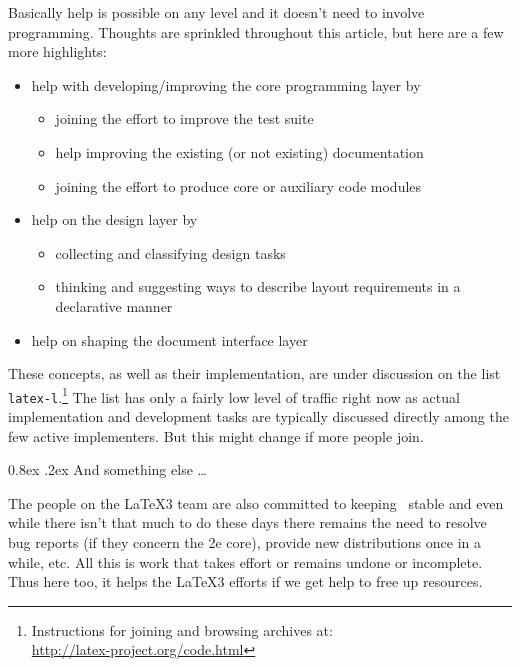 \documentclass{ltnews}
\makeatletter
\renewcommand{\@subheadingfont}{%
   \sffamily\slshape
   \let\LaTeX\cmssLaTeX\let\TeX\cmssTeX
}
\renewcommand{\subsection}{%
   \@startsection
      {subsection}{2}{\z@}{-1.3ex \@plus -1ex \@minus -.2ex}%
      {0.8ex \@plus.2ex}{\@subheadingfont}%
}
\makeatother
\begin{document}
Basically help is possible on any level and it doesn't need to involve programming. Thoughts are sprinkled throughout this article, but here are a few more highlights:
\begin{itemize}
\item help with developing/improving the core programming layer by
\begin{itemize}[nosep]
\item joining the effort to improve the test suite
\item help improving the existing (or not existing) documentation
\item joining the effort to produce core or auxiliary code modules
\end{itemize}
\item help on the design layer by
\begin{itemize}[nosep]
\item collecting and classifying design tasks
\item thinking and suggesting ways to describe layout requirements in a declarative manner
\end{itemize}
\item help on shaping the document interface layer
\end{itemize}
These concepts, as well as their implementation, are under discussion on the list \texttt{latex-l}.\footnote{Instructions for joining and browsing archives at:\\ \url{http://latex-project.org/code.html}}
The list has only a fairly low level of traffic right now as actual implementation and development tasks are typically discussed directly among the few active implementers. But this might change if more people join.

\subsection{And something else \dots}

The people on the \LaTeX3 team are also committed to keeping \LaTeXe\ stable and even while there isn't that much to do these days there remains the need to resolve bug reports (if they concern the 2e core), provide new distributions once in a while, etc. All this is work that takes effort or remains undone or incomplete. Thus here too, it helps the \LaTeX3 efforts if we get help to free up resources.
\end{document}

